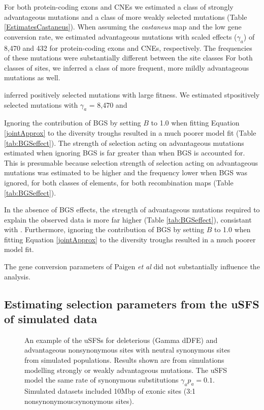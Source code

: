 \documentclass[11pt]{article}
\begin{document}
	For both protein-coding exons and CNEs we estimated a class of strongly advantageous mutations and a class of more weakly selected mutations (Table \ref{EstimatesCastaneus}). When assuming the \textit{castaneus} map and the low gene conversion rate, we estimated advantageous mutations with scaled effects ($\gamma_a$) of 8,470 and 432 for protein-coding exons and CNEs, respectively. The frequencies of these mutations were substantially different between the site classes
	For both classes of sites, we inferred a class of more frequent, more mildly advantageous mutations as well.
	
	inferred positively selected mutations with large fitness. We estimated stpositively selected mutations with $\gamma_a$ = 8,470 and 

	Ignoring the contribution of BGS by setting $B$ to 1.0 when fitting Equation \ref{jointApprox} to the diversity troughs resulted in a much poorer model fit (Table \ref{tab:BGSeffect}). The strength of selection acting on advantageous mutations estimated when ignoring BGS is far greater than when BGS is accounted for. This is presumable because selection 
	strength of selection acting on advantageous mutations was estimated to be higher and the frequency lower when BGS was ignored, for both classes of elements, for both recombination maps (Table \ref{tab:BGSeffect}). 
	
	In the absence of BGS effects, the strength of advantageous mutations required to explain the observed data is more far higher (Table \ref{tab:BGSeffect}), consistant with \cite{RN290}. Furthermore, ignoring the contribution of BGS by setting $B$ to 1.0 when fitting Equation \ref{jointApprox} to the diversity troughs resulted in a much poorer model fit.  
	
	The gene conversion parameters of Paigen \textit{et al} did not substantially influence the analysis.
	





\subsection*{Estimating selection parameters from the uSFS of simulated data}

\linespread{1}

\begin{figure}[h]
   \centering      
   \noindent{}
 \caption{An example of the uSFSs for deleterious (Gamma dDFE) and advantageous nonsynonymous sites with neutral synonymous sites from simulated populations. Results shown are from simulations modelling strongly or weakly advantageous mutations. The uSFS  model the same rate of synonymous substitutions $\gamma_a p_a = 0.1$. Simulated datasets included 10Mbp of exonic sites (3:1 nonsynonymous:synonymous sites).}
 
 \label{fig:sfsExample}
\end{figure}
\linespread{1}
\end{document}

